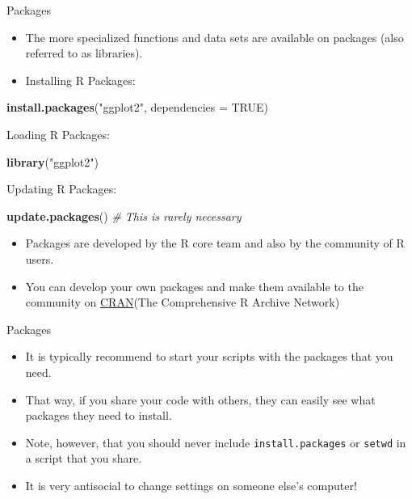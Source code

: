 \documentclass[ignorenonframetext,]{beamer}
\newenvironment{Shaded}{\begin{snugshade}}{\end{snugshade}}
\newcommand{\CommentTok}[1]{\textcolor[rgb]{0.56,0.35,0.01}{\textit{#1}}}
\newcommand{\DataTypeTok}[1]{\textcolor[rgb]{0.13,0.29,0.53}{#1}}
\newcommand{\KeywordTok}[1]{\textcolor[rgb]{0.13,0.29,0.53}{\textbf{#1}}}
\newcommand{\NormalTok}[1]{#1}
\newcommand{\OtherTok}[1]{\textcolor[rgb]{0.56,0.35,0.01}{#1}}
\newcommand{\StringTok}[1]{\textcolor[rgb]{0.31,0.60,0.02}{#1}}
\providecommand{\tightlist}{%
  \setlength{\itemsep}{0pt}\setlength{\parskip}{0pt}}
\begin{document}
\begin{frame}[fragile]{Packages}
\protect\hypertarget{packages}{}

\begin{itemize}
\item
  The more specialized functions and data sets are available on packages
  (also referred to as libraries).
\item
  Installing R Packages:
\end{itemize}

\begin{Shaded}
\begin{Highlighting}[]
\KeywordTok{install.packages}\NormalTok{(}\StringTok{"ggplot2"}\NormalTok{, }\DataTypeTok{dependencies =} \OtherTok{TRUE}\NormalTok{)}
\end{Highlighting}
\end{Shaded}

Loading R Packages:

\begin{Shaded}
\begin{Highlighting}[]
\KeywordTok{library}\NormalTok{(}\StringTok{"ggplot2"}\NormalTok{)}
\end{Highlighting}
\end{Shaded}

Updating R Packages:

\begin{Shaded}
\begin{Highlighting}[]
\KeywordTok{update.packages}\NormalTok{()  }\CommentTok{# This is rarely necessary }
\end{Highlighting}
\end{Shaded}

\begin{itemize}
\tightlist
\item
  Packages are developed by the R core team and also by the community of
  R users.
\item
  You can develop your own packages and make them available to the
  community on \href{https://cran.r-project.org}{CRAN}(The Comprehensive
  R Archive Network)
\end{itemize}

\end{frame}

\begin{frame}[fragile]{Packages}
\protect\hypertarget{packages-1}{}

\begin{itemize}
\tightlist
\item
  It is typically recommend to start your scripts with the packages that
  you need.
\item
  That way, if you share your code with others, they can easily see what
  packages they need to install.
\item
  Note, however, that you should never include \texttt{install.packages}
  or \texttt{setwd} in a script that you share.
\item
  It is very antisocial to change settings on someone else's computer!
\end{itemize}

\end{frame}
\end{document}
